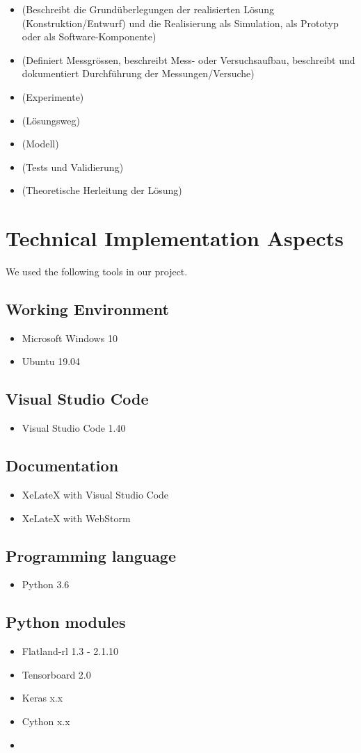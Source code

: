 \begin{itemize}
\item (Beschreibt die Grundüberlegungen der realisierten Lösung (Konstruktion/Entwurf) und die Realisierung als Simulation, als Prototyp oder als Software-Komponente)
\item (Definiert Messgrössen, beschreibt Mess- oder Versuchsaufbau, beschreibt und dokumentiert Durchführung der Messungen/Versuche)
\item (Experimente)
\item (Lösungsweg)
\item (Modell)
\item (Tests und Validierung)
\item (Theoretische Herleitung der Lösung)
\end{itemize}

\section{Technical Implementation Aspects}\label{software}
We used the following tools in our project.

\subsection*{Working Environment}\label{os}
\begin{itemize}
	\item Microsoft Windows 10
	\item Ubuntu 19.04
\end{itemize}

\subsection*{Visual Studio Code}\label{vsc}
\begin{itemize}
	\item Visual Studio Code 1.40
\end{itemize}

\subsection*{Documentation}\label{dokutools}
\begin{itemize}
	\item XeLateX with Visual Studio Code
	\item XeLateX with WebStorm
\end{itemize}


\subsection*{Programming language}\label{programminglanguages}
\begin{itemize}
	\item Python 3.6
\end{itemize}

\subsection*{Python modules}\label{modules}
\begin{itemize}
	\item Flatland-rl 1.3 - 2.1.10
	\item Tensorboard 2.0
	\item Keras x.x
	\item Cython x.x
	\item %
\end{itemize}


